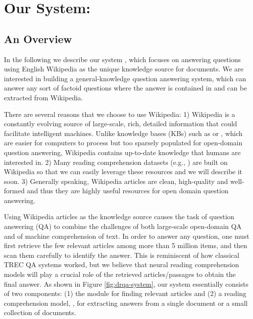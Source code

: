 
\section{Our System: }
\label{sec:drqa}

\subsection{An Overview}

In the following we describe our system , which focuses on answering questions using English Wikipedia as the unique knowledge source for documents. We are interested in building a general-knowledge question answering system, which can answer any sort of factoid questions where the answer is contained in and can be extracted from Wikipedia.

There are several reasons that we choose to use Wikipedia: 1) Wikipedia is a constantly evolving source of large-scale, rich, detailed information that could facilitate intelligent machines. Unlike knowledge bases (KBs) such as  or , which are easier for computers to process but too sparsely populated for open-domain question answering, Wikipedia contains up-to-date knowledge that humans are interested in. 2) Many reading comprehension datasets (e.g., ) are built on Wikipedia so that we can easily leverage these resources and we will describe it soon. 3) Generally speaking, Wikipedia articles are clean, high-quality and well-formed and thus they are highly useful resources for open domain question answering.

Using Wikipedia articles as the knowledge source causes the task of question answering (QA) to combine the challenges of both large-scale open-domain QA and of machine comprehension of text. In order to answer any question, one must first retrieve the few relevant articles among more than 5 million items, and then scan them carefully to identify the answer. This is reminiscent of how classical TREC QA systems worked, but we believe that neural reading comprehension models will play a crucial role of  the retrieved articles/passages to obtain the final answer. As shown in Figure \ref{fig:drqa-system}, our system essentially consists of two components: (1) the  module for finding relevant articles and (2) a reading comprehension model, , for extracting answers from a single document or a small collection of documents.

